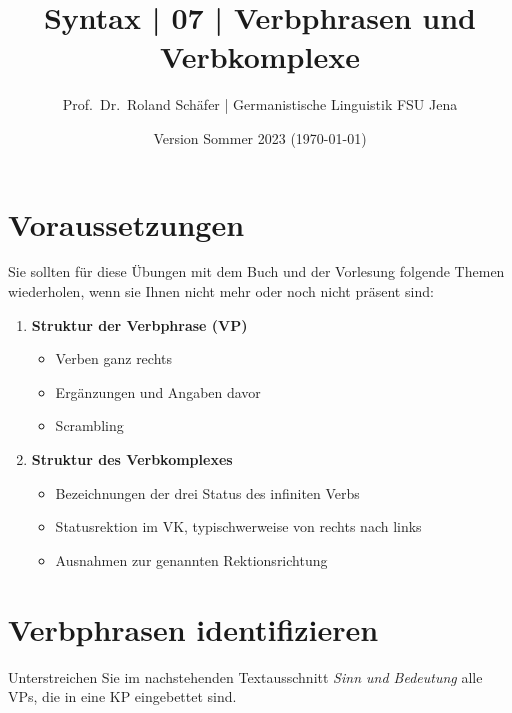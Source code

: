 \documentclass[12pt,a4paper,twoside]{article}
\author{Prof.\ Dr.\ Roland Schäfer | Germanistische Linguistik FSU Jena}
\title{Syntax | 07 | Verbphrasen und Verbkomplexe}
\date{Version Sommer 2023 (\today)}
\newcommand{\Lf}{
  \setlength{\itemsep}{1pt}
  \setlength{\parskip}{0pt}
  \setlength{\parsep}{0pt}
}
\begin{document}
\maketitle

\section*{Voraussetzungen}

Sie sollten für diese Übungen mit dem Buch und der Vorlesung folgende Themen wiederholen, wenn sie Ihnen nicht mehr oder noch nicht präsent sind:

\begin{enumerate}\Lf
  \item \textbf{Struktur der Verbphrase (VP)}
    \begin{itemize}\Lf
      \item Verben ganz rechts
      \item Ergänzungen und Angaben davor
      \item Scrambling
    \end{itemize}
  \item \textbf{Struktur des Verbkomplexes}
    \begin{itemize}\Lf
      \item Bezeichnungen der drei Status des infiniten Verbs
      \item Statusrektion im VK, typischwerweise von rechts nach links
      \item Ausnahmen zur genannten Rektionsrichtung
    \end{itemize}
\end{enumerate}

\section{Verbphrasen identifizieren}

Unterstreichen Sie im nachstehenden Textausschnitt \textit{Sinn und Bedeutung} alle VPs, die in eine KP eingebettet sind.
\end{document}
